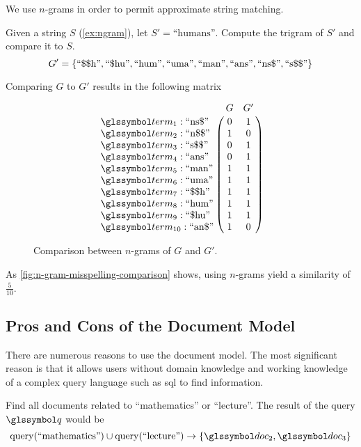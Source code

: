 		We use \(n\)-grams in order to permit approximate string matching.
		
		\begin{ex}
		\label{ex:n-gram-comparison}
			Given a string \(S\) (\vref{ex:ngram}), let \(S' = \text{``humans''}\).  Compute the trigram of \(S'\) and compare it to \(S\).
			\[
				G' = \{
					\text{``\char"24\char"24h''},
					\text{``\char"24hu''},
					\text{``hum''},
					\text{``uma''},
					\text{``man''},
					\text{``ans''},
					\text{``ns\char"24''},
					\text{``s\char"24\char"24''}
				\}
			\]
			
			Comparing \(G\) to \(G'\) results in the following matrix
			
			\begin{figure}
				\[
					\bordermatrix{
						~ & G & G' \cr
						\term_{1} : \text{``ns\char"24''} & 0 & 1 \cr
						\term_{2} : \text{``n\char"24\char"24''} & 1 & 0 \cr
						\term_{3} : \text{``s\char"24\char"24''} & 0 & 1 \cr
						\term_{4} : \text{``ans''} & 0 & 1 \cr
						\term_{5} : \text{``man''} & 1 & 1 \cr
						\term_{6} : \text{``uma''} & 1 & 1 \cr
						\term_{7} : \text{``\char"24\char"24h''} & 1 & 1 \cr
						\term_{8} : \text{``hum''} & 1 & 1 \cr
						\term_{9} : \text{``\char"24hu''} & 1 & 1 \cr
						\term_{10} : \text{``an\char"24''} & 1 & 0 \cr
					}
				\]
				
				\caption{Comparison between \(n\)-grams of \(G\) and \(G'\).}
				\label{fig:n-gram-misspelling-comparison}
			\end{figure}
			
			As \vref{fig:n-gram-misspelling-comparison} shows, using \(n\)-grams yield a similarity of \(\frac{5}{10}\).
		\end{ex}
			
	\subsection{Pros and Cons of the Document Model}
		There are numerous reasons to use the document model.  The most significant reason is that it allows users without domain knowledge and working knowledge of a complex query language such as \gls{sql} to find information.
		
		\begin{ex}
			Find all documents related to ``mathematics'' or ``lecture''.  The result of the query \(\q\) would be
			\[
				\query(\text{``mathematics''}) \cup \query(\text{``lecture''}) \rightarrow \{\doc_2, \doc_3\}
			\]
		\end{ex}
		
